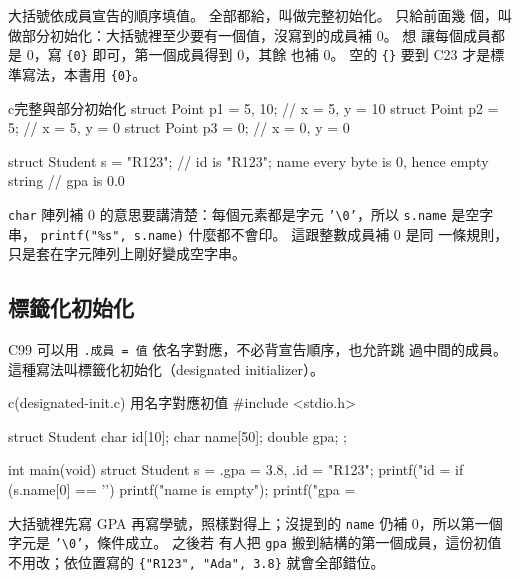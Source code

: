 大括號依成員宣告的順序填值。 全部都給，叫做完整初始化。 只給前面幾
個，叫做部分初始化：大括號裡至少要有一個值，沒寫到的成員補 $0$。 想
讓每個成員都是 $0$，寫 \texttt{\{0\}} 即可，第一個成員得到 $0$，其餘
也補 $0$。 空的 \texttt{\{\}} 要到 C23 才是標準寫法，本書用
\texttt{\{0\}}。

\begin{code}{c}{完整與部分初始化}
struct Point p1 = {5, 10};   // x = 5, y = 10
struct Point p2 = {5};       // x = 5, y = 0
struct Point p3 = {0};       // x = 0, y = 0

struct Student s = {"R123"};
// id is "R123"; name every byte is 0, hence empty string
// gpa is 0.0
\end{code}

\texttt{char} 陣列補 $0$ 的意思要講清楚：每個元素都是字元
\texttt{'\textbackslash 0'}，所以 \texttt{s.name} 是空字串，
\texttt{printf("\%s", s.name)} 什麼都不會印。 這跟整數成員補 $0$ 是同
一條規則，只是套在字元陣列上剛好變成空字串。

\subsection{標籤化初始化}

C99 可以用 \texttt{.成員 = 值} 依名字對應，不必背宣告順序，也允許跳
過中間的成員。 這種寫法叫標籤化初始化（designated initializer）。

\begin{example}{c}{(designated-init.c) 用名字對應初值}
#include <stdio.h>

struct Student {
    char id[10];
    char name[50];
    double gpa;
};

int main(void) {
    struct Student s = {.gpa = 3.8, .id = "R123"};
    printf("id = %
    if (s.name[0] == '\0') {
        printf("name is empty\n");
    }
    printf("gpa = %
}
\end{example}


大括號裡先寫 GPA 再寫學號，照樣對得上；沒提到的 \texttt{name} 仍補
$0$，所以第一個字元是 \texttt{'\textbackslash 0'}，條件成立。 之後若
有人把 \texttt{gpa} 搬到結構的第一個成員，這份初值不用改；依位置寫的
\texttt{\{"R123", "Ada", 3.8\}} 就會全部錯位。


